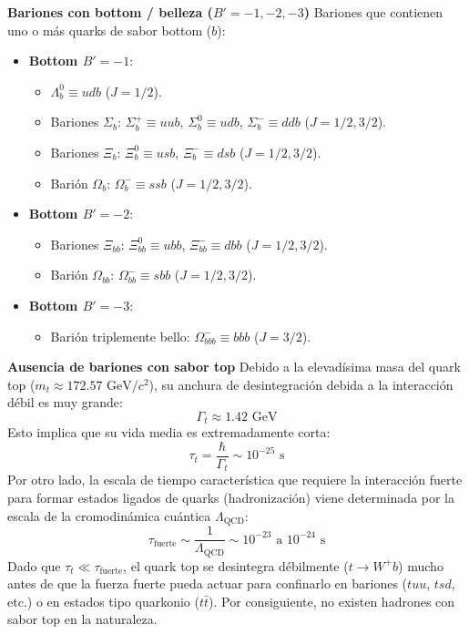 \textbf{Bariones con bottom / belleza ($B' = -1, -2, -3$)}
Bariones que contienen uno o más quarks de sabor bottom ($b$):
\begin{itemize}
    \item \textbf{Bottom $B' = -1$}:
    \begin{itemize}
        \item $\Lambda_b^0 \equiv udb$ ($J = 1/2$).
        \item Bariones $\Sigma_b$: $\Sigma_b^+ \equiv uub$, $\Sigma_b^0 \equiv udb$, $\Sigma_b^- \equiv ddb$ ($J = 1/2, 3/2$).
        \item Bariones $\Xi_b$: $\Xi_b^0 \equiv usb$, $\Xi_b^- \equiv dsb$ ($J = 1/2, 3/2$).
        \item Barión $\Omega_b$: $\Omega_b^- \equiv ssb$ ($J = 1/2, 3/2$).
    \end{itemize}
    \item \textbf{Bottom $B' = -2$}:
    \begin{itemize}
        \item Bariones $\Xi_{bb}$: $\Xi_{bb}^0 \equiv ubb$, $\Xi_{bb}^- \equiv dbb$ ($J = 1/2, 3/2$).
        \item Barión $\Omega_{bb}$: $\Omega_{bb}^- \equiv sbb$ ($J = 1/2, 3/2$).
    \end{itemize}
    \item \textbf{Bottom $B' = -3$}:
    \begin{itemize}
        \item Barión triplemente bello: $\Omega_{bbb}^- \equiv bbb$ ($J = 3/2$).
    \end{itemize}
\end{itemize}

\textbf{Ausencia de bariones con sabor top}
Debido a la elevadísima masa del quark top ($m_t \approx 172.57 \text{ GeV}/c^2$), su anchura de desintegración debida a la interacción débil es muy grande:
\begin{equation}
    \Gamma_t \approx 1.42 \text{ GeV}
\end{equation}
Esto implica que su vida media es extremadamente corta:
\begin{equation}
    \tau_t = \frac{\hbar}{\Gamma_t} \sim 10^{-25} \text{ s}
\end{equation}
Por otro lado, la escala de tiempo característica que requiere la interacción fuerte para formar estados ligados de quarks (hadronización) viene determinada por la escala de la cromodinámica cuántica $\Lambda_{\text{QCD}}$:
\begin{equation}
    \tau_{\text{fuerte}} \sim \frac{1}{\Lambda_{\text{QCD}}} \sim 10^{-23} \text{ a } 10^{-24} \text{ s}
\end{equation}
Dado que $\tau_t \ll \tau_{\text{fuerte}}$, el quark top se desintegra débilmente ($t \to W^+ b$) mucho antes de que la fuerza fuerte pueda actuar para confinarlo en bariones ($tuu$, $tsd$, etc.) o en estados tipo quarkonio ($t\bar{t}$). Por consiguiente, no existen hadrones con sabor top en la naturaleza.

